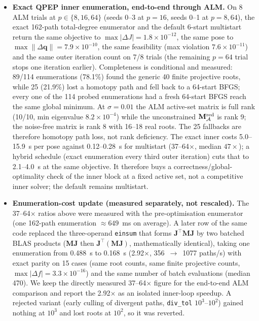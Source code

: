 \begin{itemize}
\item \textbf{Exact QPEP inner enumeration, end-to-end through ALM.} On 8 ALM trials at $p\in\{8,16,64\}$ (seeds 0--3 at $p=16$, seeds 0--1 at $p=8,64$), the exact 162-path total-degree enumerator and the default 6-start multistart return the same objective to $\max|\Delta J|=1.8\times10^{-12}$, the same pose to $\max\|\Delta\mathbf q\|=7.9\times10^{-10}$, the same feasibility (max violation $7.6\times10^{-11}$) and the same outer iteration count on 7/8 trials (the remaining $p=64$ trial stops one iteration earlier). Completeness is conditional and measured: 89/114 enumerations (78.1\%) found the generic 40 finite projective roots, while 25 (21.9\%) lost a homotopy path and fell back to a 64-start BFGS; every one of the 114 probed enumerations had a fresh 64-start BFGS reach the same global minimum. At $\sigma=0.01$ the ALM active-set matrix is full rank (10/10, min eigenvalue $8.2\times10^{-4}$) while the unconstrained $\mathbf M^{\rm red}_{\mathcal A}$ is rank 9; the noise-free matrix is rank 8 with 16--18 real roots. The 25 fallbacks are therefore homotopy path loss, not rank deficiency. The exact inner costs 5.0--15.9~s per pose against 0.12--0.28~s for multistart (37--64$\times$, median $47\times$); a hybrid schedule (exact enumeration every third outer iteration) cuts that to 2.1--4.0~s at the same objective. It therefore buys a correctness/global-optimality check of the inner block at a fixed active set, not a competitive inner solver; the default remains multistart.
\item \textbf{Enumeration-cost update (measured separately, not rescaled).} The 37--64$\times$ ratios above were measured with the pre-optimisation enumerator (one 162-path enumeration $\approx649$~ms on average). A later row of the same code replaced the three-operand \texttt{einsum} that forms $\mathbf J^\top\mathbf M\mathbf J$ by two batched BLAS products ($\mathbf M\mathbf J$ then $\mathbf J^\top(\mathbf M\mathbf J)$, mathematically identical), taking one enumeration from 0.488~s to 0.168~s (2.92$\times$, 356~$\to$~1077 paths/s) with exact parity on 15 cases (same root counts, same finite projective counts, $\max|\Delta f|=3.3\times10^{-16}$) and the same number of batch evaluations (median 470). We keep the directly measured 37--64$\times$ figure for the end-to-end ALM comparison and report the 2.92$\times$ as an isolated inner-loop speedup. A rejected variant (early culling of divergent paths, \texttt{div\_tol} $10^3$--$10^2$) gained nothing at $10^3$ and lost roots at $10^2$, so it was reverted.

\end{itemize}
